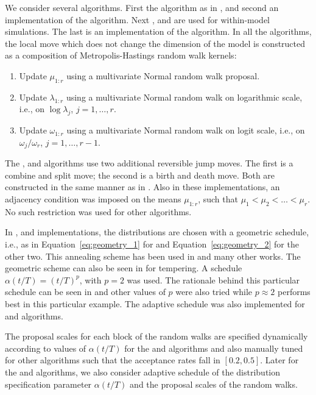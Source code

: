 We consider several algorithms. First the \rjmcmc algorithm as in
\cite{Richardson:1997ea}, and second an implementation of the \smc[1]
algorithm. Next \ais, \pmcmc and \smc[2] are used for within-model
simulations. The last is an implementation of the \smc[3] algorithm. In all
the algorithms, the local move which does not change the dimension of the
model is constructed as a composition of Metropolis-Hastings random walk
kernels:
\begin{enumerate}
  \item Update $\mu_{1:r}$ using a multivariate Normal random walk proposal.
  \item Update $\lambda_{1:r}$ using a multivariate Normal random walk on
    logarithmic scale, i.e., on $\log\lambda_{j}$, $j = 1, \dots, r$.
  \item Update $\omega_{1:r}$ using a multivariate Normal random walk on logit
    scale, i.e., on $\omega_{j}/\omega_r$, $j = 1,\dots,r-1$.
\end{enumerate}
The \rjmcmc, \smc[1] and \smc[3] algorithms use two additional
reversible jump moves. The first is a combine and split move; the second is a
birth and death move. Both are constructed in the same manner as in
\cite{Richardson:1997ea}. Also in these implementations, an adjacency
condition was imposed on the means $\mu_{1:r}$, such that $\mu_1 < \mu_2 <
\dots < \mu_r$. No such restriction was used for other algorithms.

In \smc[1], \smc[2] and \pmcmc implementations, the distributions are chosen
with a geometric schedule, i.e., as in Equation~\eqref{eq:geometry_1} for
\smc[1] and Equation~\eqref{eq:geometry_2} for the other two. This annealing
scheme has been used in \cite{DelMoral:2006hc,Jasra:2007in} and many other
works. The geometric scheme can also be seen in \cite{Calderhead:2009bd} for
\pmcmc tempering. A schedule $\alpha(t/T) = (t/T)^p$, with $p = 2$ was used.
The rationale behind this particular schedule can be seen in
\cite{Calderhead:2009bd} and other values of $p$ were also tried while
$p\approx2$ performs best in this particular example. The adaptive schedule
was also implemented for \smc[2] and \ais algorithms.

The proposal scales for each block of the random walks are specified
dynamically according to values of $\alpha(t/T)$ for the \smc[2] and \ais
algorithms and also manually tuned for other algorithms such that the
acceptance rates fall in $[0.2, 0.5]$. Later for the \smc[2] and \ais
algorithms, we also consider adaptive schedule of the distribution
specification parameter $\alpha(t/T)$ and the proposal scales of the random
walks.

